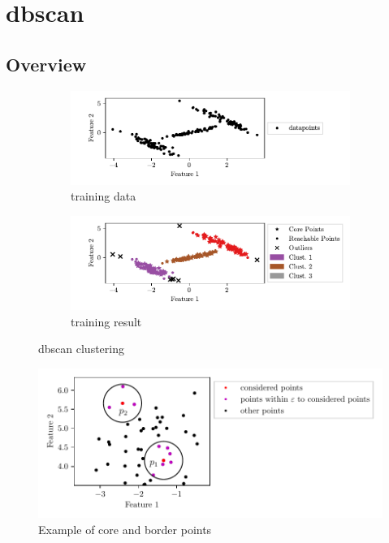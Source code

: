 \section{\gls{dbscan}}
\label{sec:dbscan}

\subsection{Overview}

\begin{figure}[htbp]
    \centering
    \begin{subfigure}{\textwidth}
    \includegraphics[width=\textwidth]{images/DBSCAN/Figure_1.pdf}
    \caption{training data}
    \label{fig:dbscandata}
    \end{subfigure}
    \begin{subfigure}{\textwidth}
    \includegraphics[width=\textwidth]{images/DBSCAN/Figure_2.pdf}
    \caption{training result}
    \label{fig:dbscanresult}
    \end{subfigure}
    \caption{\gls{dbscan} clustering}
    \label{fig:dbscan}
\end{figure}

\begin{figure}
    \centering
    \includegraphics[width=\textwidth]{images/DBSCAN/Figure_3.pdf}
    \caption{Example of core and border points}
    \label{fig:dbscanparams}
\end{figure}

